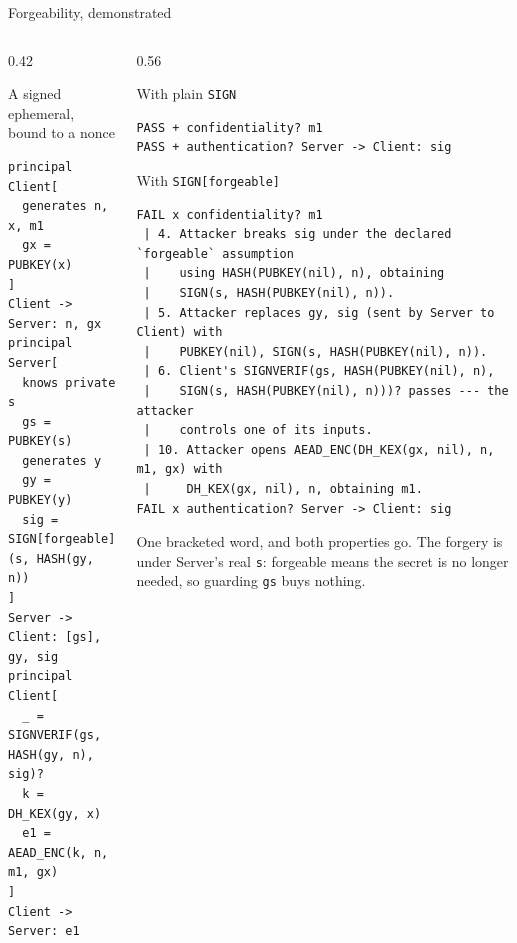 \ifdefined\PRESENTATION\else\PassOptionsToClass{handout}{beamer}\fi\documentclass[aspectratio=169, lualatex]{beamer}
\newcommand{\vpcode}{\fontsize{6}{6.4}\selectfont\ttfamily\color{vpink}}
\begin{document}
\begin{frame}[fragile]{Forgeability, demonstrated}
	\begin{columns}[t]
		\begin{column}{0.42\textwidth}
			\begin{vpmodel}[top=0.5mm, bottom=0.5mm]{A signed ephemeral, bound to a nonce}
				\begin{lstlisting}[basicstyle=\vpcode]
principal Client[
  generates n, x, m1
  gx = PUBKEY(x)
]
Client -> Server: n, gx
principal Server[
  knows private s
  gs = PUBKEY(s)
  generates y
  gy = PUBKEY(y)
  sig = SIGN[forgeable](s, HASH(gy, n))
]
Server -> Client: [gs], gy, sig
principal Client[
  _ = SIGNVERIF(gs, HASH(gy, n), sig)?
  k = DH_KEX(gy, x)
  e1 = AEAD_ENC(k, n, m1, gx)
]
Client -> Server: e1
\end{lstlisting}
			\end{vpmodel}
		\end{column}
		\begin{column}{0.56\textwidth}
			\begin{vpresult}[top=0.5mm, bottom=0.5mm]{With plain \texttt{SIGN}}
				\begin{lstlisting}[basicstyle=\vpcode]
PASS + confidentiality? m1
PASS + authentication? Server -> Client: sig
\end{lstlisting}
			\end{vpresult}
			\vspace{0.1em}
			\begin{vpresult}[top=0.5mm, bottom=0.5mm]{With \texttt{SIGN[forgeable]}}
				\begin{lstlisting}[basicstyle=\vpcode]
FAIL x confidentiality? m1
 | 4. Attacker breaks sig under the declared `forgeable` assumption
 |    using HASH(PUBKEY(nil), n), obtaining
 |    SIGN(s, HASH(PUBKEY(nil), n)).
 | 5. Attacker replaces gy, sig (sent by Server to Client) with
 |    PUBKEY(nil), SIGN(s, HASH(PUBKEY(nil), n)).
 | 6. Client's SIGNVERIF(gs, HASH(PUBKEY(nil), n),
 |    SIGN(s, HASH(PUBKEY(nil), n)))? passes --- the attacker
 |    controls one of its inputs.
 | 10. Attacker opens AEAD_ENC(DH_KEX(gx, nil), n, m1, gx) with
 |     DH_KEX(gx, nil), n, obtaining m1.
FAIL x authentication? Server -> Client: sig
\end{lstlisting}
			\end{vpresult}
			\vspace{0.1em}
			\scriptsize
			One bracketed word, and both properties go. The forgery is under Server's real \texttt{s}: forgeable means the secret is no longer needed, so guarding \texttt{gs} buys nothing.\vspace{-0.6em}
		\end{column}
	\end{columns}
\end{frame}
\end{document}
